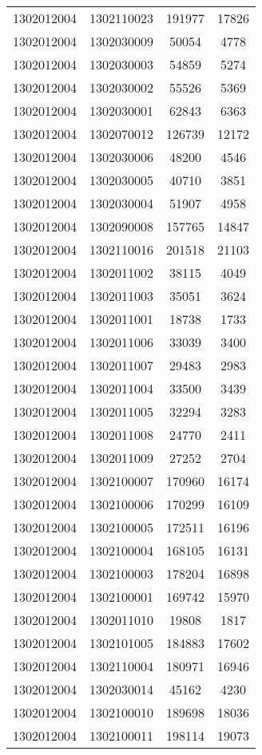 \begin{longtable}{llcc}
1302012004 & 1302110023 & 191977 & 17826\\
1302012004 & 1302030009 & 50054 & 4778\\
1302012004 & 1302030003 & 54859 & 5274\\
1302012004 & 1302030002 & 55526 & 5369\\
1302012004 & 1302030001 & 62843 & 6363\\
1302012004 & 1302070012 & 126739 & 12172\\
1302012004 & 1302030006 & 48200 & 4546\\
1302012004 & 1302030005 & 40710 & 3851\\
1302012004 & 1302030004 & 51907 & 4958\\
1302012004 & 1302090008 & 157765 & 14847\\
1302012004 & 1302110016 & 201518 & 21103\\
1302012004 & 1302011002 & 38115 & 4049\\
1302012004 & 1302011003 & 35051 & 3624\\
1302012004 & 1302011001 & 18738 & 1733\\
1302012004 & 1302011006 & 33039 & 3400\\
1302012004 & 1302011007 & 29483 & 2983\\
1302012004 & 1302011004 & 33500 & 3439\\
1302012004 & 1302011005 & 32294 & 3283\\
1302012004 & 1302011008 & 24770 & 2411\\
1302012004 & 1302011009 & 27252 & 2704\\
1302012004 & 1302100007 & 170960 & 16174\\
1302012004 & 1302100006 & 170299 & 16109\\
1302012004 & 1302100005 & 172511 & 16196\\
1302012004 & 1302100004 & 168105 & 16131\\
1302012004 & 1302100003 & 178204 & 16898\\
1302012004 & 1302100001 & 169742 & 15970\\
1302012004 & 1302011010 & 19808 & 1817\\
1302012004 & 1302101005 & 184883 & 17602\\
1302012004 & 1302110004 & 180971 & 16946\\
1302012004 & 1302030014 & 45162 & 4230\\
1302012004 & 1302100010 & 189698 & 18036\\
1302012004 & 1302100011 & 198114 & 19073\\

\end{longtable}

